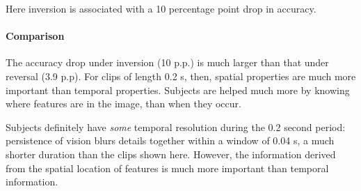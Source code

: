 Here inversion is associated with a 10 percentage point drop in accuracy.

\paragraph{Comparison}

The accuracy drop under inversion (10 p.p.) is much larger than that under reversal (3.9 p.p). For clips of length 0.2 s, then, spatial properties are much more important than temporal properties. Subjects are helped much more by knowing where features are in the image, than when they occur.

Subjects definitely have \textit{some} temporal resolution during the 0.2 second period: persistence of vision blurs details together within a window of 0.04 s\cite{edridge1945persistence}, a much shorter duration than the clips shown here. However, the information derived from the spatial location of features is much more important than temporal information.
